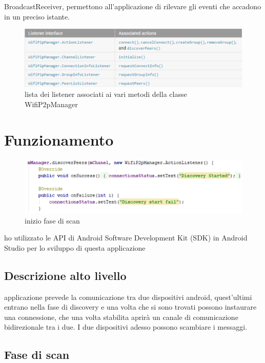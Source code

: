 BroadcastReceiver, permettono all’applicazione di rilevare gli eventi che
accadono in un preciso istante.
\begin{figure}
   \centering
   \caption{lista dei listener associati ai vari metodi della classe WifiP2pManager}
   \includegraphics[width=1\columnwidth]{imgs/listenerwifip2pmanager.jpg}
\end{figure}

\section{Funzionamento}

\begin{figure}
   \centering
   \caption{inizio fase di scan}
   \includegraphics[width=1\columnwidth]{imgs/discoveryStart.png} %
\end{figure}
ho utilizzato le API di Android Software Development Kit (SDK)
in Android Studio \cite{ASD} per lo sviluppo di questa applicazione

\subsection{Descrizione alto livello}

applicazione prevede la comunicazione tra due dispositivi android,
quest'ultimi entrano nella fase di discovery e una volta che si sono trovati
possono instaurare una connessione,
che una volta stabilita aprirà un canale di comunicazione bidirezionale tra i due.
I due dispositivi adesso possono scambiare i messaggi.

\subsection{Fase di scan}

